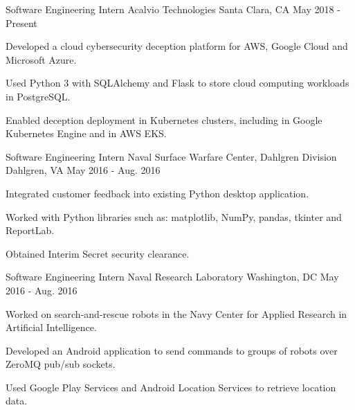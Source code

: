 \begin{cventries}
  \cventry
    {Software Engineering Intern}
    {Acalvio Technologies}
    {Santa Clara, CA}
    {May 2018 - Present}
    {
      \begin{cvitems}
        \item {Developed a cloud cybersecurity deception platform for AWS, Google Cloud and Microsoft Azure.}
        \item {Used Python 3 with SQLAlchemy and Flask to store cloud computing workloads in PostgreSQL.}
        \item {Enabled deception deployment in Kubernetes clusters, including in Google Kubernetes Engine and in AWS EKS.}
      \end{cvitems}
    }
  \cventry
    {Software Engineering Intern}
    {Naval Surface Warfare Center, Dahlgren Division}
    {Dahlgren, VA}
    {May 2016 - Aug. 2016}
    {
      \begin{cvitems}
        \item {Integrated customer feedback into existing Python desktop application.}
        \item {Worked with Python libraries such as: matplotlib, NumPy, pandas, tkinter and ReportLab.}
        \item {Obtained Interim Secret security clearance.}
      \end{cvitems}
    }
  \cventry
    {Software Engineering Intern}
    {Naval Research Laboratory}
    {Washington, DC}
    {May 2016 - Aug. 2016}
    {
      \begin{cvitems}
        \item {Worked on search-and-rescue robots in the Navy Center for Applied Research in Artificial Intelligence.}
        \item {Developed an Android application to send commands to groups of robots over ZeroMQ pub/sub sockets.}
        \item {Used Google Play Services and Android Location Services to retrieve location data.}
      \end{cvitems}
    }
\end{cventries}
